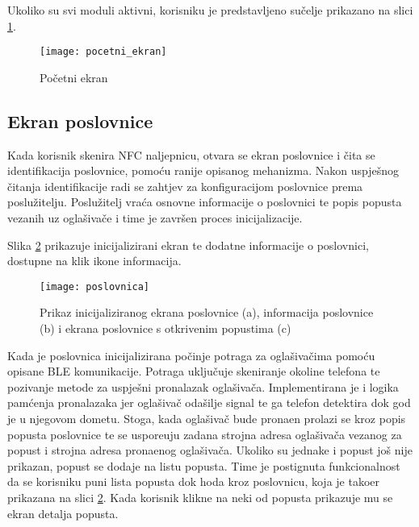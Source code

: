 Ukoliko su svi moduli aktivni, korisniku je predstavljeno su\v{c}elje prikazano na slici \ref{fig:pocetniEkran}.


\begin{figure}[!htbp]
	\begin{center}
 \texttt{[image: pocetni\_ekran]}
 \caption{Po\v{c}etni ekran}
 \label{fig:pocetniEkran}
	\end{center}
\end{figure}


\subsection{Ekran poslovnice}

Kada korisnik skenira NFC naljepnicu, otvara se ekran poslovnice i \v{c}ita se identifikacija poslovnice, pomo\'{c}u ranije opisanog mehanizma. Nakon uspje\v{s}nog \v{c}itanja identifikacije radi se zahtjev za konfiguracijom poslovnice prema poslu\v{z}itelju. Poslu\v{z}itelj vra\'{c}a osnovne informacije o poslovnici te popis popusta vezanih uz ogla\v{s}iva\v{c}e i time je zavr\v{s}en proces inicijalizacije.

Slika \ref{fig:poslovnica} prikazuje inicijalizirani ekran te dodatne informacije o poslovnici, dostupne na klik ikone informacija.



\begin{figure}[!htbp]
	\begin{center}
 \texttt{[image: poslovnica]}
 \caption{Prikaz inicijaliziranog ekrana poslovnice (a), informacija poslovnice (b) i ekrana poslovnice s otkrivenim popustima (c)}
 \label{fig:poslovnica}
	\end{center}
\end{figure}

Kada je poslovnica inicijalizirana po\v{c}inje potraga za ogla\v{s}iva\v{c}ima pomo\'{c}u opisane BLE komunikacije. Potraga uklju\v{c}uje skeniranje okoline telefona te pozivanje metode za uspje\v{s}ni pronalazak ogla\v{s}iva\v{c}a. Implementirana je i logika pam\'{c}enja pronalazaka jer ogla\v{s}iva\v{c} oda\v{s}ilje signal te ga telefon  detektira dok god je u njegovom dometu. Stoga, kada ogla\v{s}iva\v{c} bude prona\dj en prolazi se kroz popis popusta poslovnice te se uspore\dj uju zadana strojna adresa ogla\v{s}iva\v{c}a vezanog za popust i strojna adresa prona\dj enog ogla\v{s}iva\v{c}a. Ukoliko su jednake i popust jo\v{s} nije prikazan, popust se dodaje na listu popusta. Time je postignuta funkcionalnost da se korisniku puni lista popusta dok hoda kroz poslovnicu, koja je tako\dj er prikazana na slici \ref{fig:poslovnica}. Kada korisnik klikne na neki od popusta prikazuje mu se ekran detalja popusta.

